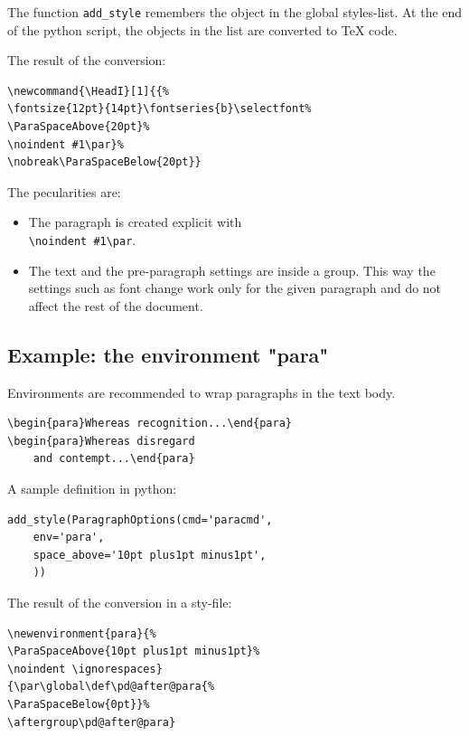 \documentclass[]{ltugboat}
\begin{document}
The function \verb|add_style| remembers the object in the global styles-list. At the end of the python script, the objects in the list are converted to \TeX{} code.

The result of the conversion:

\begin{verbatim}
\newcommand{\HeadI}[1]{{%
\fontsize{12pt}{14pt}\fontseries{b}\selectfont%
\ParaSpaceAbove{20pt}%
\noindent #1\par}%
\nobreak\ParaSpaceBelow{20pt}}
\end{verbatim}

The pecularities are:

\begin{itemize}
\item The paragraph is created explicit with\\\verb|\noindent #1\par|.
\item The text and the pre-paragraph settings are inside a group. This way the settings such as font change work only for the given paragraph and do not affect the rest of the document.
\end{itemize}

\subsection{Example: the environment "para"}

Environments are recommended to wrap paragraphs in the text body.

\begin{verbatim}
\begin{para}Whereas recognition...\end{para}
\begin{para}Whereas disregard
    and contempt...\end{para}
\end{verbatim}

A sample definition in python:

\begin{verbatim}
add_style(ParagraphOptions(cmd='paracmd',
    env='para',
    space_above='10pt plus1pt minus1pt',
    ))
\end{verbatim}

The result of the conversion in a sty-file:

\begin{verbatim}
\newenvironment{para}{%
\ParaSpaceAbove{10pt plus1pt minus1pt}%
\noindent \ignorespaces}
{\par\global\def\pd@after@para{%
\ParaSpaceBelow{0pt}}%
\aftergroup\pd@after@para}
\end{verbatim}
\end{document}
